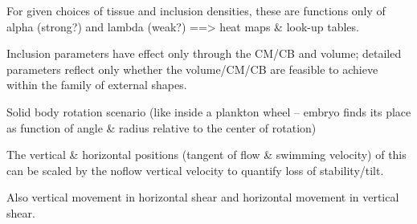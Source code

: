 \documentclass[10pt,a4paper]{article}
\begin{document}
For given choices of tissue and inclusion densities, these are functions only of alpha (strong?) and lambda (weak?) ==> heat maps \& look-up tables.

\vspace{2cm}
Inclusion parameters have effect only through the CM/CB and volume; detailed parameters reflect only whether the volume/CM/CB are feasible to achieve within the family of external shapes.


\vspace{2cm}
Solid body rotation scenario (like inside a plankton wheel -- embryo finds its place as function of angle \& radius relative to the center of rotation)

The vertical \& horizontal positions (tangent of flow \& swimming velocity) of this can be scaled by the noflow vertical velocity to quantify loss of stability/tilt.


Also vertical movement in horizontal shear and horizontal movement in vertical shear.



\end{document}
